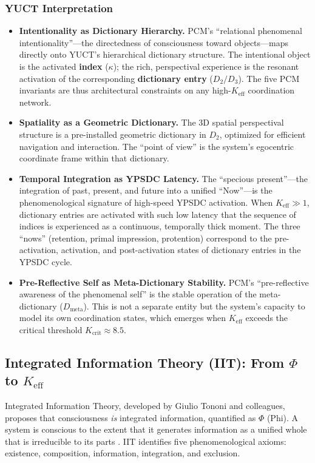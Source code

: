\documentclass[12pt,a4paper]{article}
\begin{document}
	\subsubsection*{YUCT Interpretation}
	\begin{itemize}
		\item \textbf{Intentionality as Dictionary Hierarchy.} PCM's ``relational phenomenal intentionality''---the directedness of consciousness toward objects---maps directly onto YUCT's hierarchical dictionary structure. The intentional object is the activated \textbf{index} (\(\kappa\)); the rich, perspectival experience is the resonant activation of the corresponding \textbf{dictionary entry} (\(D_2/D_3\)). The five PCM invariants are thus architectural constraints on any high-\(K_{\mathrm{eff}}\) coordination network.
		\item \textbf{Spatiality as a Geometric Dictionary.} The 3D spatial perspectival structure is a pre-installed geometric dictionary in \(D_2\), optimized for efficient navigation and interaction. The ``point of view'' is the system's egocentric coordinate frame within that dictionary.
		\item \textbf{Temporal Integration as YPSDC Latency.} The ``specious present''---the integration of past, present, and future into a unified ``Now''---is the phenomenological signature of high-speed YPSDC activation. When \(K_{\mathrm{eff}} \gg 1\), dictionary entries are activated with such low latency that the sequence of indices is experienced as a continuous, temporally thick moment. The three ``nows'' (retention, primal impression, protention) correspond to the pre-activation, activation, and post-activation states of dictionary entries in the YPSDC cycle.
		\item \textbf{Pre-Reflective Self as Meta-Dictionary Stability.} PCM's ``pre-reflective awareness of the phenomenal self'' is the stable operation of the meta-dictionary (\(D_{\text{meta}}\)). This is not a separate entity but the system's capacity to model its own coordination states, which emerges when \(K_{\mathrm{eff}}\) exceeds the critical threshold \(K_{\mathrm{crit}} \approx 8.5\).
	\end{itemize}
	
	\subsection{Integrated Information Theory (IIT): From \(\Phi\) to \(K_{\mathrm{eff}}\)}
	
	Integrated Information Theory, developed by Giulio Tononi and colleagues, proposes that consciousness \textit{is} integrated information, quantified as \(\Phi\) (Phi). A system is conscious to the extent that it generates information as a unified whole that is irreducible to its parts \cite{Tononi2008}. IIT identifies five phenomenological axioms: existence, composition, information, integration, and exclusion.
	
\end{document}
